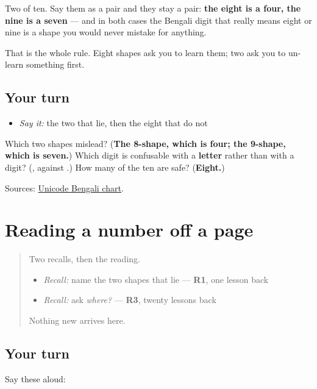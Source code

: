 Two of ten. Say them as a pair and they stay a pair: \textbf{the eight is a four, the nine is a seven} — and in both cases the Bengali digit that really means eight or nine is a shape you would never mistake for anything.

That is the whole rule. Eight shapes ask you to learn them; two ask you to un-learn something first.

\subsection*{Your turn}
\begin{itemize}
\raggedright
  \item \emph{Say it:} the two that lie, then the eight that do not
\end{itemize}

\begin{tcolorbox}[breakable,colback=teal!4,colframe=teal!35!black,title={Before you move on}]
Which two shapes mislead? (\textbf{The 8-shape, which is four; the 9-shape, which is seven.}) Which digit is confusable with a \textbf{letter} rather than with a digit? (\textbf{}, against \textbf{}.) How many of the ten are safe? (\textbf{Eight.})

Sources: \href{https://www.unicode.org/charts/PDF/U0980.pdf}{Unicode Bengali chart}.
\end{tcolorbox}
\section[Practice]{Reading a number off a page}

\label{lesson:BN-R28-read-a-number}



\begin{quote}
Two recalls, then the reading.

\begin{itemize}
\raggedright
  \item \emph{Recall:} name the two shapes that lie — \textbf{R1}, one lesson back
  \item \emph{Recall:} ask \emph{where?} — \textbf{R3}, twenty lessons back
\end{itemize}

Nothing new arrives here.
\end{quote}

\subsection*{Your turn}
Say these aloud:

